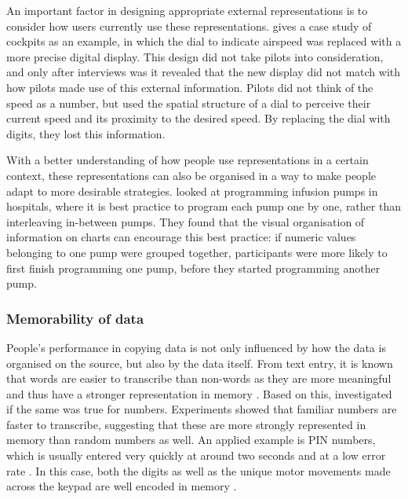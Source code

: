 An important factor in designing appropriate external representations is to consider how users currently use these representations. \citet{Hutchins1995} gives a case study of cockpits as an example, in which the dial to indicate airspeed was replaced with a more precise digital display. This design did not take pilots into consideration, and only after interviews was it revealed that the new display did not match with how pilots made use of this external information. Pilots did not think of the speed as a number, but used the spatial structure of a dial to perceive their current speed and its proximity to the desired speed. By replacing the dial with digits, they lost this information. 

With a better understanding of how people use representations in a certain context, these representations can also be organised in a way to make people adapt to more desirable strategies. \citet{Back2013b} looked at programming infusion pumps in hospitals, where it is best practice to program each pump one by one, rather than interleaving in-between pumps. They found that the visual organisation of information on charts can encourage this best practice: if numeric values belonging to one pump were grouped together, participants were more likely to first finish programming one pump, before they started programming another pump.

\subsubsection{Memorability of data}
People's performance in copying data is not only influenced by how the data is organised on the source, but also by the data itself.
From text entry, it is known that words are easier to transcribe than non-words as they are more meaningful and thus have a stronger representation in memory \citep{Salthouse1986}. Based on this, \citet{Wiseman2014} investigated if the same was true for numbers. Experiments showed that familiar numbers are faster to transcribe, suggesting that these are more strongly represented in memory than random numbers as well.
An applied example is PIN numbers, which is usually entered very quickly at around two seconds and at a low error rate \citep{DeLuca2010}. In this case, both the digits as well as the unique motor movements made across the keypad are well encoded in memory \citep{Mangen2010}. 

